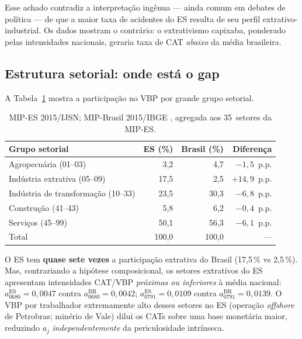 \documentclass[12pt, a4paper]{article}
\begin{document}
Esse achado contradiz a interpretação ingênua --- ainda comum em
debates de política --- de que a maior taxa de acidentes do ES resulta
de seu perfil extrativo-industrial. Os dados mostram o contrário: o
extrativismo capixaba, ponderado pelas intensidades nacionais, geraria
taxa de CAT \textit{abaixo} da média brasileira.

\subsection{Estrutura setorial: onde está o gap}

A Tabela~\ref{tab:bres_vbp} mostra a participação no VBP por grande grupo
setorial.

\begin{table}[H]
\centering
\small
\caption{Participação no VBP por grande grupo --- ES vs Brasil, 2015 (\%)}
\label{tab:bres_vbp}
\begin{tabular}{lrrr}
\toprule
\textbf{Grupo setorial} & \textbf{ES (\%)} & \textbf{Brasil (\%)} & \textbf{Diferença} \\
\midrule
Agropecuária (01--03) & 3{,}2 & 4{,}7 & $-1{,}5$~p.p. \\
Indústria extrativa (05--09) & 17{,}5 & 2{,}5 & $+14{,}9$~p.p. \\
Indústria de transformação (10--33) & 23{,}5 & 30{,}3 & $-6{,}8$~p.p. \\
Construção (41--43) & 5{,}8 & 6{,}2 & $-0{,}4$~p.p. \\
Serviços (45--99) & 50{,}1 & 56{,}3 & $-6{,}1$~p.p. \\
\midrule
Total & 100{,}0 & 100{,}0 & --- \\
\bottomrule
\end{tabular}
\caption*{\footnotesize MIP-ES 2015/IJSN; MIP-Brasil 2015/IBGE
\citep{ibge2017mipbr}, agregada aos 35~setores da MIP-ES.}
\end{table}

O ES tem \textbf{quase sete vezes} a participação extrativa do Brasil
(17{,}5\,\% vs 2{,}5\,\%). Mas, contrariando a hipótese composicional,
os setores extrativos do ES apresentam intensidades CAT/VBP
\textit{próximas ou inferiores} à média nacional: $a_{0680}^{\text{ES}} = 0{,}0047$
contra $a_{0680}^{\text{BR}} = 0{,}0042$; $a_{0791}^{\text{ES}} = 0{,}0109$
contra $a_{0791}^{\text{BR}} = 0{,}0139$. O VBP por trabalhador
extremamente alto desses setores no ES (operação \textit{offshore} de
Petrobras; minério de Vale) dilui os CATs sobre uma base monetária
maior, reduzindo $a_j$ \textit{independentemente} da periculosidade
intrínseca.
\end{document}
